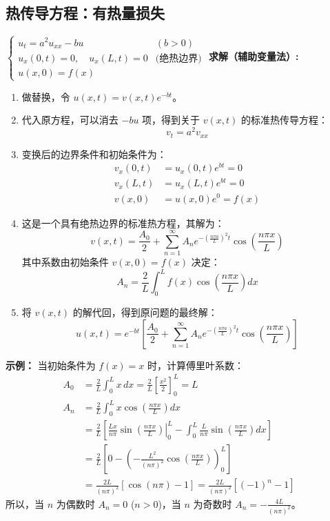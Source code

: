 \documentclass{article}
\begin{document}
	\subsection{热传导方程：有热量损失}
	$\begin{cases}
		u_t = a^2 u_{xx} - bu & (b>0) \\
		u_x(0,t) = 0, \quad u_x(L,t) = 0 & \text{(绝热边界)} \\
		u(x,0) = f(x)
	\end{cases}$
	\textbf{求解（辅助变量法）:}
	\begin{enumerate}
		\item 做替换，令 $u(x,t) = v(x,t)e^{-bt}$。
		\item 代入原方程，可以消去 $-bu$ 项，得到关于 $v(x,t)$ 的标准热传导方程：
		$$
		v_t = a^2 v_{xx}
		$$
		\item 变换后的边界条件和初始条件为：
		\begin{align*}
			v_x(0,t) &= u_x(0,t)e^{bt} = 0 \\
			v_x(L,t) &= u_x(L,t)e^{bt} = 0 \\
			v(x,0) &= u(x,0)e^{0} = f(x)
		\end{align*}
		\item 这是一个具有绝热边界的标准热方程，其解为：
		$$
		v(x,t) = \frac{A_0}{2} + \sum_{n=1}^{\infty} A_n e^{-\left(\frac{n\pi a}{L}\right)^2 t} \cos\left(\frac{n\pi x}{L}\right)
		$$
		其中系数由初始条件 $v(x,0)=f(x)$ 决定：
		$$
		A_n = \frac{2}{L} \int_0^L f(x) \cos\left(\frac{n\pi x}{L}\right) dx
		$$
		\item 将 $v(x,t)$ 的解代回，得到原问题的最终解：
		$$
		u(x,t) = e^{-bt} \left[ \frac{A_0}{2} + \sum_{n=1}^{\infty} A_n e^{-\left(\frac{n\pi a}{L}\right)^2 t} \cos\left(\frac{n\pi x}{L}\right) \right]
		$$
	\end{enumerate}
	\textbf{示例：} 当初始条件为 $f(x)=x$ 时，计算傅里叶系数：
	\begin{align*}
		A_0 &= \frac{2}{L} \int_0^L x \,dx = \frac{2}{L} \left[ \frac{x^2}{2} \right]_0^L = L \\
		A_n &= \frac{2}{L} \int_0^L x \cos\left(\frac{n\pi x}{L}\right) dx \\
		&= \frac{2}{L} \left[ \left. \frac{Lx}{n\pi}\sin\left(\frac{n\pi x}{L}\right) \right|_0^L - \int_0^L \frac{L}{n\pi}\sin\left(\frac{n\pi x}{L}\right) dx \right] \\
		&= \frac{2}{L} \left[ 0 - \left( -\frac{L^2}{(n\pi)^2}\cos\left(\frac{n\pi x}{L}\right) \right)_0^L \right] \\
		&= \frac{2L}{(n\pi)^2} [\cos(n\pi) - 1] = \frac{2L}{(n\pi)^2} [(-1)^n - 1]
	\end{align*}
	所以，当 $n$ 为偶数时 $A_n=0$ ($n>0$)，当 $n$ 为奇数时 $A_n = -\frac{4L}{(n\pi)^2}$。
	
\end{document}
